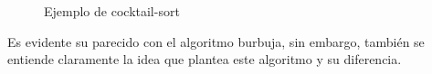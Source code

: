 \documentclass[12pt,twoside]{article}
\begin{document}
\begin{figure}[h]
    \centering
    \begin{equation}
        [ \longrightarrow 3,0,5,6,7,2]
    \end{equation}
    \begin{equation}
        [3,0,5,6,2,\longrightarrow 7]
    \end{equation}
    \begin{equation}
        [3,0,5,6,2,7 \longleftarrow]
    \end{equation}
    \begin{equation}
        [0 \longleftarrow ,3,5,6,2,7]
    \end{equation}
    \begin{equation}
        [ \longrightarrow 0,3,5,6,2,7]
    \end{equation}
    \begin{equation}
        [0,3,5,2,\longrightarrow 6,7]
    \end{equation}
    \begin{equation}
        [0,3,5,2,6,7 \longleftarrow]
    \end{equation}
    \begin{equation}
        [0,2 \longleftarrow ,3,5,6,7]
    \end{equation}
    \begin{equation}
        [ \longrightarrow 0,2,3,5,6,7]
    \end{equation}
    \begin{equation}
        [ 0,2,3,5,6,7 \longrightarrow]
    \end{equation}
    \caption{Ejemplo de cocktail-sort}
    \label{eq:cocktail}
\end{figure}
Es evidente su parecido con el algoritmo burbuja, sin embargo, tambi\'en se entiende claramente la idea que plantea este algoritmo y su diferencia.
\end{document}
